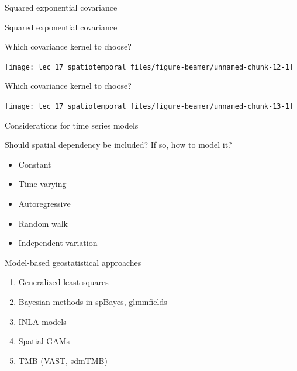 \documentclass[
  ignorenonframetext,
]{beamer}
\providecommand{\tightlist}{%
  \setlength{\itemsep}{0pt}\setlength{\parskip}{0pt}}
\begin{document}
\begin{frame}{Squared exponential covariance}
\protect\hypertarget{squared-exponential-covariance}{}

\end{frame}

\begin{frame}{Squared exponential covariance}
\protect\hypertarget{squared-exponential-covariance-1}{}

\end{frame}

\begin{frame}{Which covariance kernel to choose?}
\protect\hypertarget{which-covariance-kernel-to-choose}{}

\begin{center}\texttt{[image: lec\_17\_spatiotemporal\_files/figure-beamer/unnamed-chunk-12-1]} \end{center}

\end{frame}

\begin{frame}{Which covariance kernel to choose?}
\protect\hypertarget{which-covariance-kernel-to-choose-1}{}

\begin{center}\texttt{[image: lec\_17\_spatiotemporal\_files/figure-beamer/unnamed-chunk-13-1]} \end{center}

\end{frame}

\begin{frame}{Considerations for time series models}
\protect\hypertarget{considerations-for-time-series-models}{}

Should spatial dependency be included? If so, how to model it?

\begin{itemize}
\tightlist
\item
  Constant
\item
  Time varying
\item
  Autoregressive
\item
  Random walk
\item
  Independent variation
\end{itemize}

\end{frame}

\begin{frame}{Model-based geostatistical approaches}
\protect\hypertarget{model-based-geostatistical-approaches}{}

\begin{enumerate}
\item
  Generalized least squares
\item
  Bayesian methods in spBayes, glmmfields
\item
  INLA models
\item
  Spatial GAMs
\item
  TMB (VAST, sdmTMB)
\end{enumerate}

\end{frame}
\end{document}
